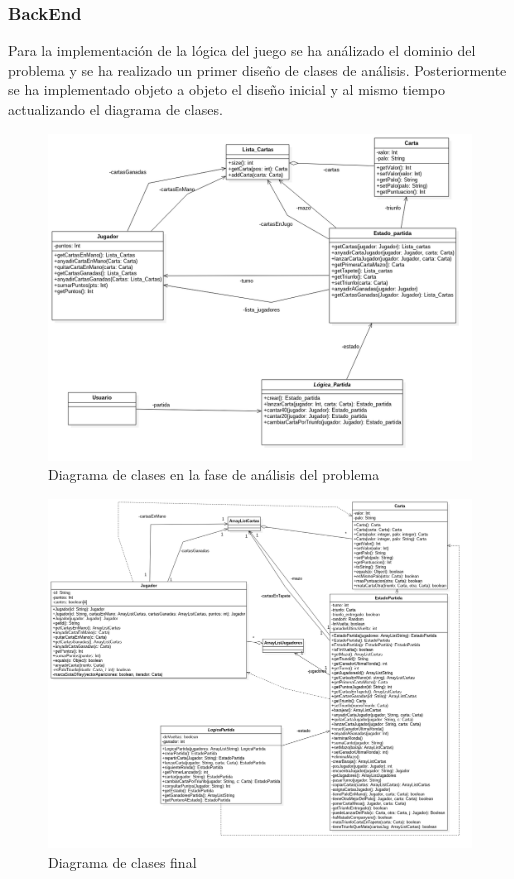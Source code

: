 \subsubsection{BackEnd}

Para la implementación de la lógica del juego se ha análizado el dominio del problema y se ha realizado un primer diseño de clases de análisis. Posteriormente se ha implementado objeto a objeto el diseño inicial y al mismo tiempo actualizando el diagrama de clases.

\begin{figure}[H]
\centering
\includegraphics[scale = 0.5]{figuras/logica_juego/diagramaClasesDisenyo.png}
\caption{Diagrama de clases en la fase de análisis del problema}
\label{fig:diagramaClasesLogicaJuegoInicial}
\end{figure}

\begin{figure}[H]
\centering
\includegraphics[scale = 0.5]{figuras/logica_juego/diagramaClasesImplementacion.png}
\caption{Diagrama de clases final}
\label{fig:diagramaClasesLogicaJuegoFinal}
\end{figure}

